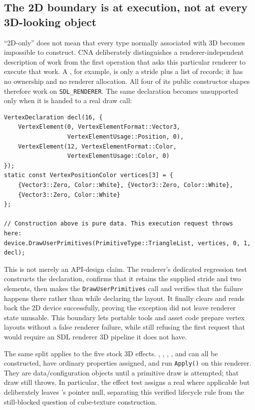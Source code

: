 \subsection{The 2D boundary is at execution, not at every 3D-looking object}

``2D-only'' does not mean that every type normally associated with 3D becomes impossible to
construct.  CNA deliberately distinguishes a renderer-independent description of work from
the first operation that asks this particular renderer to execute that work.  A
, for example, is only a stride plus a list of
 records; it has no  ownership and no
renderer allocation.  All four of its public constructor shapes therefore work on
\texttt{SDL\_RENDERER}.  The same declaration becomes unsupported only when it is handed to a
real draw call:

\begin{lstlisting}
VertexDeclaration decl(16, {
    VertexElement(0, VertexElementFormat::Vector3,
                  VertexElementUsage::Position, 0),
    VertexElement(12, VertexElementFormat::Color,
                  VertexElementUsage::Color, 0)
});
static const VertexPositionColor vertices[3] = {
    {Vector3::Zero, Color::White}, {Vector3::Zero, Color::White},
    {Vector3::Zero, Color::White}
};

// Construction above is pure data. This execution request throws here:
device.DrawUserPrimitives(PrimitiveType::TriangleList, vertices, 0, 1, decl);
\end{lstlisting}

This is not merely an API-design claim.  The renderer's dedicated regression test constructs
the declaration, confirms that it retains the supplied stride and two elements, then makes the
\texttt{DrawUserPrimitives} call and verifies that the failure happens there rather than while
declaring the layout.  It finally clears and reads back the 2D device successfully, proving
the exception did not leave renderer state unusable.  This boundary lets portable tools and
asset code prepare vertex layouts without a false renderer failure, while still refusing the
first request that would require an SDL renderer 3D pipeline it does not have.

The same split applies to the five stock 3D effects.  ,
, , ,
and  can all be constructed, have ordinary properties assigned, and
run \texttt{Apply()} on this renderer.  They are data/configuration objects until a primitive
draw is attempted; that draw still throws.  In particular, the effect test assigns a real
 where applicable but deliberately leaves
's  pointer null, separating this
verified lifecycle rule from the still-blocked question of cube-texture construction.

